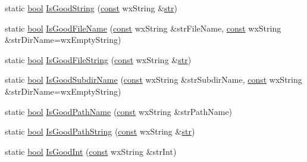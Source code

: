 \begin{DoxyCompactItemize}
\item 
static \hyperlink{mac_2config_2i386_2lib-src_2libsoxr_2soxr-config_8h_abb452686968e48b67397da5f97445f5b}{bool} \hyperlink{class_x_m_l_value_checker_adf2bcfece118875538ca2bdd528b8c23}{Is\+Good\+String} (\hyperlink{getopt1_8c_a2c212835823e3c54a8ab6d95c652660e}{const} wx\+String \&\hyperlink{sndfile__save_8m_a4b99ff73a8a869319570237b5c57ab03}{str})
\item 
static \hyperlink{mac_2config_2i386_2lib-src_2libsoxr_2soxr-config_8h_abb452686968e48b67397da5f97445f5b}{bool} \hyperlink{class_x_m_l_value_checker_ace939107688c8886ec015cfbbab8cebe}{Is\+Good\+File\+Name} (\hyperlink{getopt1_8c_a2c212835823e3c54a8ab6d95c652660e}{const} wx\+String \&str\+File\+Name, \hyperlink{getopt1_8c_a2c212835823e3c54a8ab6d95c652660e}{const} wx\+String \&str\+Dir\+Name=wx\+Empty\+String)
\item 
static \hyperlink{mac_2config_2i386_2lib-src_2libsoxr_2soxr-config_8h_abb452686968e48b67397da5f97445f5b}{bool} \hyperlink{class_x_m_l_value_checker_a05d805de92f483d377f1822839dd3700}{Is\+Good\+File\+String} (\hyperlink{getopt1_8c_a2c212835823e3c54a8ab6d95c652660e}{const} wx\+String \&\hyperlink{sndfile__save_8m_a4b99ff73a8a869319570237b5c57ab03}{str})
\item 
static \hyperlink{mac_2config_2i386_2lib-src_2libsoxr_2soxr-config_8h_abb452686968e48b67397da5f97445f5b}{bool} \hyperlink{class_x_m_l_value_checker_a2702c903d5f13e71eac3cec59b4034a9}{Is\+Good\+Subdir\+Name} (\hyperlink{getopt1_8c_a2c212835823e3c54a8ab6d95c652660e}{const} wx\+String \&str\+Subdir\+Name, \hyperlink{getopt1_8c_a2c212835823e3c54a8ab6d95c652660e}{const} wx\+String \&str\+Dir\+Name=wx\+Empty\+String)
\item 
static \hyperlink{mac_2config_2i386_2lib-src_2libsoxr_2soxr-config_8h_abb452686968e48b67397da5f97445f5b}{bool} \hyperlink{class_x_m_l_value_checker_a97ca6cdce1f85f74fff3bd59dcc28d48}{Is\+Good\+Path\+Name} (\hyperlink{getopt1_8c_a2c212835823e3c54a8ab6d95c652660e}{const} wx\+String \&str\+Path\+Name)
\item 
static \hyperlink{mac_2config_2i386_2lib-src_2libsoxr_2soxr-config_8h_abb452686968e48b67397da5f97445f5b}{bool} \hyperlink{class_x_m_l_value_checker_a67526db38314c2ca8ddfa4e9d8f311ee}{Is\+Good\+Path\+String} (\hyperlink{getopt1_8c_a2c212835823e3c54a8ab6d95c652660e}{const} wx\+String \&\hyperlink{sndfile__save_8m_a4b99ff73a8a869319570237b5c57ab03}{str})
\item 
static \hyperlink{mac_2config_2i386_2lib-src_2libsoxr_2soxr-config_8h_abb452686968e48b67397da5f97445f5b}{bool} \hyperlink{class_x_m_l_value_checker_adc0cf9db4d3e99dfdc8c82144e129103}{Is\+Good\+Int} (\hyperlink{getopt1_8c_a2c212835823e3c54a8ab6d95c652660e}{const} wx\+String \&str\+Int)

\end{DoxyCompactItemize}
